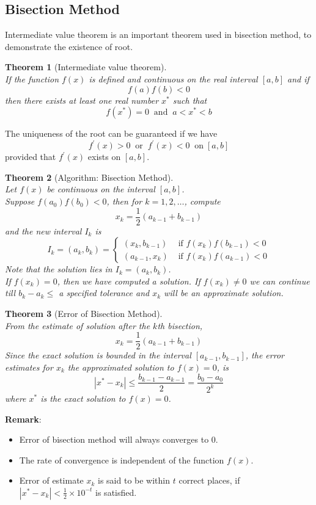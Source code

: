 \documentclass[12pt]{article}
\newtheorem{theorem}{Theorem}[section]
\theoremstyle{definition}
\begin{document}
\subsection{Bisection Method}
Intermediate value theorem is an important theorem used in bisection method, to demonstrate the existence of root.
\begin{theorem}[Intermediate value theorem]
\hfill\\\normalfont If the function $f(x)$ is defined and continuous on the real interval $[a,b]$ and if
\[
f(a)f(b)<0
\]
then there exists at least one real number $x^\ast$ such that
\[
f(x^\ast)=0\;\;\text{and}\;\;a<x^\ast<b
\]
\end{theorem}
The uniqueness of the root can be guaranteed if we have 
\[
f^\prime(x)>0\;\;\text{or}\;\;f^\prime(x)<0\;\;\text{on}\;[a,b]
\]
provided that $f^\prime(x)$ exists on $[a,b]$.
\begin{theorem}[Algorithm: Bisection Method]
\hfill\\\normalfont Let $f(x)$ be continuous on the interval $[a,b]$.\\Suppose $f(a_0)f(b_0)<0$, then for $k=1,2,\ldots$, compute
\[
x_k=\frac{1}{2}(a_{k-1}+b_{k-1})
\]
and the new interval $I_k$ is
\[
I_k=(a_k,b_k)=\begin{cases}
(x_k,b_{k-1})&\text{ if }f(x_k)f(b_{k-1})<0\\
(a_{k-1},x_k)&\text{ if }f(x_k)f(a_{k-1})<0
\end{cases}
\]
Note that the solution lies in $I_k=(a_k,b_k)$.\\
If $f(x_k)=0$, then we have computed a solution. If $f(x_k)\neq 0$ we can continue till $b_k-a_k\leq$ a specified tolerance and $x_k$ will be an approximate solution.
\end{theorem}
\begin{theorem}[Error of Bisection Method]
\hfill\\\normalfont From the estimate of solution after the $k$th bisection,
\[
x_k=\frac{1}{2}(a_{k-1}+b_{k-1})
\]
Since the exact solution is bounded in the interval $[a_{k-1}, b_{k-1}]$, the error estimates for $x_k$ the approximated solution to $f(x)=0$, is
\[
|x^\ast-x_k|\leq \frac{b_{k-1}-a_{k-1}}{2}=\frac{b_0-a_0}{2^k}
\]
where $x^\ast$ is the exact solution to $f(x)=0$.
\end{theorem}
\textbf{Remark}:
\begin{itemize}
  \item Error of bisection method will always converges to $0$.
  \item The rate of convergence is independent of the function $f(x)$.
  \item Error of estimate $x_k$ is said to be within $t$ correct places, if $|x^\ast-x_k|<\frac{1}{2}\times 10^{-t}$ is satisfied.
\end{itemize}
\end{document}

